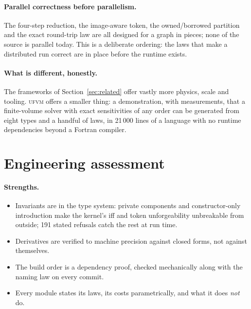 \documentclass[11pt,a4paper]{article}
\newcommand{\ufvm}{\textsc{ufvm}}
\begin{document}
\paragraph{Parallel correctness before parallelism.} The four-step reduction, the image-aware token, the owned/borrowed partition and the exact round-trip law are all designed for a graph in pieces; none of the source is parallel today. This is a deliberate ordering: the laws that make a distributed run correct are in place before the runtime exists.

\paragraph{What is different, honestly.} The frameworks of Section~\ref{sec:related} offer vastly more physics, scale and tooling. \ufvm{} offers a smaller thing: a demonstration, with measurements, that a finite-volume solver with exact sensitivities of any order can be generated from eight types and a handful of laws, in 21\,000 lines of a language with no runtime dependencies beyond a Fortran compiler.

\section{Engineering assessment}\label{sec:assessment}

\paragraph{Strengths.}
\begin{itemize}[nosep]
\item Invariants are in the type system: private components and constructor-only introduction make the kernel's iff and token unforgeability unbreakable from outside; 191 stated refusals catch the rest at run time.
\item Derivatives are verified to machine precision against closed forms, not against themselves.
\item The build order is a dependency proof, checked mechanically along with the naming law on every commit.
\item Every module states its laws, its costs parametrically, and what it does \emph{not} do.
\end{itemize}
\end{document}
